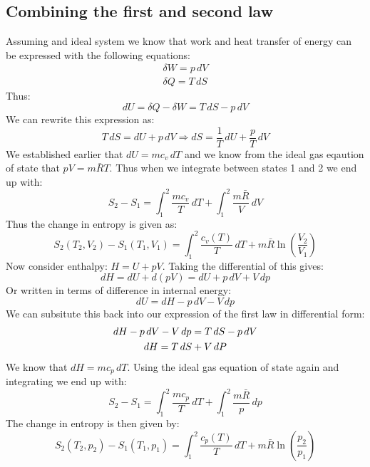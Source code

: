 \documentclass[11pt, a4paper]{article}
\begin{document}
\subsection{Combining the first and second law}
Assuming and ideal system we know that work and heat transfer of energy can be expressed with the following equations:
\begin{gather}
  \delta W = p\,dV\\
  \delta Q = T\,dS
\end{gather}
Thus:
\begin{equation}
  dU = \delta Q - \delta W = T\,dS - p\,dV
\end{equation}
We can rewrite this expression as:
\begin{equation}
  T\,dS = dU + p\,dV \Rightarrow dS = \frac{1}{T}\,dU + \frac{p}{T}\,dV
\end{equation}
We established earlier that $dU = mc_v\,dT$ and we know from the ideal gas eqaution of state that $pV = m\bar{R}T$. Thus when we integrate between states 1 and 2 we end up with:
\begin{equation}
  S_2 - S_1 = \int_1^2 \frac{mc_v}{T}\,dT + \int_1^2 \frac{m\bar{R}}{V}\,dV
\end{equation}
Thus the change in entropy is given as:
\begin{equation}
  S_2(T_2, V_2) - S_1(T_1, V_1) = \int_1^2 \frac{c_v(T)}{T}\,dT + m\bar{R}\ln\left(\frac{V_2}{V_1}\right)
\end{equation}
Now consider enthalpy: $H = U + pV$. Taking the differential of this gives:
\begin{equation}
  dH = dU + d(pV) = dU + p\,dV + V\,dp
\end{equation}
Or written in terms of difference in internal energy:
\begin{equation}
  dU = dH - p\,dV - V\,dp
\end{equation}
We can subsitute this back into our expression of the first law in differential form:
\begin{gather}
  dH - p\,dV - V\,dp = T\,dS - p\,dV \notag\\
  dH = T\,dS + V\,dP
\end{gather}
We know that $dH = mc_p\,dT$. Using the ideal gas equation of state again and integrating we end up with:
\begin{equation}
  S_2 - S_1 = \int_1^2 \frac{mc_p}{T}\,dT + \int_1^2 \frac{m\bar{R}}{p}\,dp
\end{equation}
The change in entropy is then given by:
\begin{equation}
  S_2(T_2, p_2) - S_1(T_1, p_1) = \int_1^2 \frac{c_p(T)}{T}\,dT + m\bar{R}\ln\left(\frac{p_2}{p_1}\right)
\end{equation}
\end{document}
